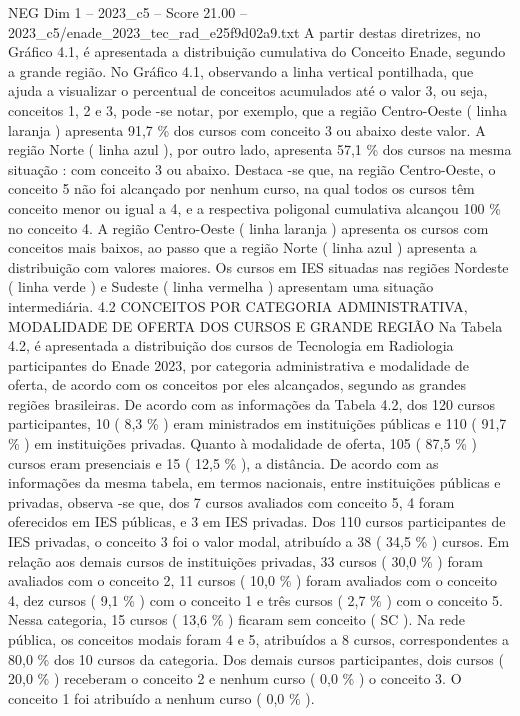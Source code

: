 \begin{textsample}{NEG Dim 1 – 2023\_c5 – Score 21.00 – 2023\_c5/enade\_2023\_tec\_rad\_e25f9d02a9.txt}
A partir destas diretrizes, no Gráfico 4.1, é apresentada a distribuição cumulativa do Conceito Enade, segundo a grande região.
No Gráfico 4.1, observando a linha vertical pontilhada, que ajuda a visualizar o percentual de conceitos acumulados até o valor 3, ou seja, conceitos 1, 2 e 3, pode -se notar, por exemplo, que a região Centro-Oeste ( linha laranja ) apresenta 91,7 \% dos cursos com conceito 3 ou abaixo deste valor.
A região Norte ( linha azul ), por outro lado, apresenta 57,1 \% dos cursos na mesma situação : com conceito 3 ou abaixo.
Destaca -se que, na região Centro-Oeste, o conceito 5 não foi alcançado por nenhum curso, na qual todos os cursos têm conceito menor ou igual a 4, e a respectiva poligonal cumulativa alcançou 100 \% no conceito 4.
A região Centro-Oeste ( linha laranja ) apresenta os cursos com conceitos mais baixos, ao passo que a região Norte ( linha azul ) apresenta a distribuição com valores maiores.
Os cursos em IES situadas nas regiões Nordeste ( linha verde ) e Sudeste ( linha vermelha ) apresentam uma situação intermediária. 4.2 CONCEITOS POR CATEGORIA ADMINISTRATIVA, MODALIDADE DE OFERTA DOS CURSOS E GRANDE REGIÃO Na Tabela 4.2, é apresentada a distribuição dos cursos de Tecnologia em Radiologia participantes do Enade 2023, por categoria administrativa e modalidade de oferta, de acordo com os conceitos por eles alcançados, segundo as grandes regiões brasileiras.
De acordo com as informações da Tabela 4.2, dos 120 cursos participantes, 10 ( 8,3 \% ) eram ministrados em instituições públicas e 110 ( 91,7 \% ) em instituições privadas.
Quanto à modalidade de oferta, 105 ( 87,5 \% ) cursos eram presenciais e 15 ( 12,5 \% ), a distância.
De acordo com as informações da mesma tabela, em termos nacionais, entre instituições públicas e privadas, observa -se que, dos 7 cursos avaliados com conceito 5, 4 foram oferecidos em IES públicas, e 3 em IES privadas.
Dos 110 cursos participantes de IES privadas, o conceito 3 foi o valor modal, atribuído a 38 ( 34,5 \% ) cursos.
Em relação aos demais cursos de instituições privadas, 33 cursos ( 30,0 \% ) foram avaliados com o conceito 2, 11 cursos ( 10,0 \% ) foram avaliados com o conceito 4, dez cursos ( 9,1 \% ) com o conceito 1 e três cursos ( 2,7 \% ) com o conceito 5.
Nessa categoria, 15 cursos ( 13,6 \% ) ficaram sem conceito ( SC ).
Na rede pública, os conceitos modais foram 4 e 5, atribuídos a 8 cursos, correspondentes a 80,0 \% dos 10 cursos da categoria.
Dos demais cursos participantes, dois cursos ( 20,0 \% ) receberam o conceito 2 e nenhum curso ( 0,0 \% ) o conceito 3.
O conceito 1 foi atribuído a nenhum curso ( 0,0 \% ).

\end{textsample}
